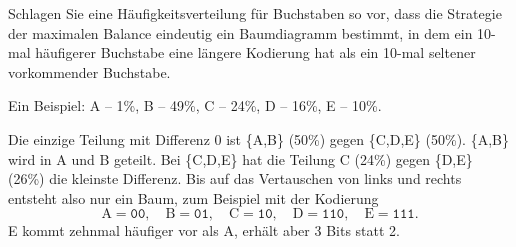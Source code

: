 \begin{mychallenge}
	Schlagen Sie eine Häufigkeitsverteilung für Buchstaben so vor, dass die Strategie der maximalen Balance eindeutig ein Baumdiagramm bestimmt, in dem ein 10-mal häufigerer Buchstabe eine längere Kodierung hat als ein 10-mal seltener vorkommender Buchstabe.
	\begin{myanswer}
		Ein Beispiel: A -- 1\%, B -- 49\%, C -- 24\%, D -- 16\%, E -- 10\%.

		Die einzige Teilung mit Differenz 0 ist \{A,B\} (50\%) gegen \{C,D,E\} (50\%). \{A,B\} wird in A und B geteilt. Bei \{C,D,E\} hat die Teilung C (24\%) gegen \{D,E\} (26\%) die kleinste Differenz. Bis auf das Vertauschen von links und rechts entsteht also nur ein Baum, zum Beispiel mit der Kodierung
		\[\text{A} = \texttt{00},\quad \text{B} = \texttt{01},\quad \text{C} = \texttt{10},\quad \text{D} = \texttt{110},\quad \text{E} = \texttt{111}.\]
		E kommt zehnmal häufiger vor als A, erhält aber 3 Bits statt 2.
	\end{myanswer}
\end{mychallenge}

